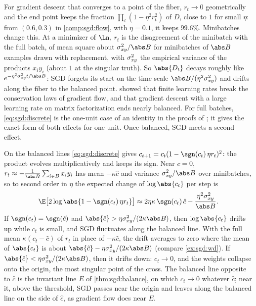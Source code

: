 \begin{refsection}
For gradient descent that converges to a point of the fiber, $r_t\to0$ geometrically and the end point keeps the fraction $\prod_t(1-\eta^2r_t^2)$ of $D$, close to $1$ for small $\eta$: from $(0.6,0.3)$ in \cref{comp:sgd:flow}, with $\eta=0.1$, it keeps $99.6\%$. Minibatches change this. At a minimizer of $\Ln$, $r_t$ is the disagreement of the minibatch with the full batch, of mean square about $\sgdvar/\abs B$ for minibatches of $\abs B$ examples drawn with replacement, with $\sigma_{xy}^2$ the empirical variance of the products $x_iy_i$ (about $1$ at the singular truth). So $\abs{D_t}$ decays roughly like $e^{-\eta^2\sgdvar t/\abs B}$: SGD forgets its start on the time scale $\abs B/(\eta^2\sgdvar)$ and drifts along the fiber to the balanced point. \Textcite{KuninEtAl2021} showed that finite learning rates break the conservation laws of gradient flow, and \textcite{WangEtAl2022} that gradient descent with a large learning rate on matrix factorization ends nearly balanced. For full batches, \eqref{eq:sgd:discrete} is the one-unit case of an identity in the proofs of \textcite[Appendix~B.1]{DuEtAl2018}; it gives the exact form of both effects for one unit. Once balanced, SGD meets a second effect.

\begin{heuristic}
On the balanced lines \eqref{eq:sgd:discrete} gives $c_{t+1}=c_t(1-\sgn(c_t)\,\eta r_t)^2$: the product evolves multiplicatively and keeps its sign. Near $c=0$, $r_t\approx-\frac1{\abs B}\sum_{i\in B}x_iy_i$ has mean $-\kappa\hat c$ and variance $\sgdvar/\abs B$ over minibatches, so to second order in $\eta$ the expected change of $\log\abs{c_t}$ per step is
\[
\E\bigl[2\log\abs{1-\sgn(c_t)\,\eta r_t}\bigr]\approx2\eta\kappa\,\sgn(c_t)\,\hat c-\frac{\eta^2\sgdvar}{\abs B} .
\]
If $\sgn(c_t)=\sgn(\hat c)$ and $\abs{\hat c}>\eta\sgdvar/(2\kappa\abs B)$, then $\log\abs{c_t}$ drifts up while $c_t$ is small, and SGD fluctuates along the balanced line. With the full mean $\kappa(c_t-\hat c)$ of $r_t$ in place of $-\kappa\hat c$, the drift averages to zero where the mean of $\abs{c_t}$ is about $\abs{\hat c}-\eta\sgdvar/(2\kappa\abs B)$ (compare \cref{ex:sgd:wd}). If $\abs{\hat c}<\eta\sgdvar/(2\kappa\abs B)$, then it drifts down: $c_t\to0$, and the weights collapse onto the origin, the most singular point of the cross. The balanced line opposite to $\hat c$ is the invariant line $E$ of \cref{thm:sgd:balance}, on which $c_t\to0$ whatever $\hat c$; near it, above the threshold, SGD passes near the origin and leaves along the balanced line on the side of $\hat c$, as gradient flow does near $E$.
\end{heuristic}


\end{refsection}
